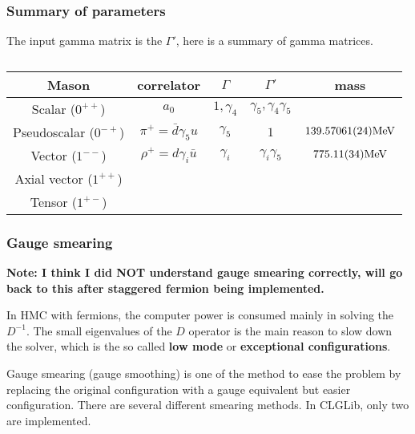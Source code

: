 \subsubsection{\label{SummaryOfparametersMesonCorrelator}Summary of parameters}

The input gamma matrix is the $\Gamma '$, here is a summary of gamma matrices.

\begin{table}
\begin{center}
\begin{tabular}{ccccc}
\hline
Mason & correlator & $\Gamma$ & $\Gamma '$ & mass \\
\hline
Scalar ($0^{++}$) & $a_0$ & $1,\gamma _4$ & $\gamma _5,\gamma _4\gamma _5$ & \\
Pseudoscalar ($0^{-+}$) & $\pi ^+=\bar{d}\gamma _5u$ & $\gamma _5$ & $1$ & $139.57061(24){\rm MeV}$ \\
Vector ($1^{--}$) & $\rho ^+ = d\gamma _i \bar{u}$ & $\gamma _i$ & $\gamma _i\gamma _5$ & $775.11(34){\rm MeV}$ \\
Axial vector ($1^{++}$)& & & & \\
Tensor ($1^{+-}$)& & & & \\
\hline
\end{tabular}
\end{center}
\caption{\label{tab2}}
\end{table}


\subsubsection{\label{Gauge_Smearing}Gauge smearing}

\textbf{\textcolor[rgb]{1,0,0}{Note: I think I did NOT understand gauge smearing correctly, will go back to this after staggered fermion being implemented.}}

In HMC with fermions, the computer power is consumed mainly in solving the $D^{-1}$. The small eigenvalues of the $D$ operator is the main reason to slow down the solver, which is the so called \textbf{low mode} or \textbf{exceptional configurations}.

Gauge smearing (gauge smoothing) is one of the method to ease the problem by replacing the original configuration with a gauge equivalent but easier configuration. There are several different smearing methods. In CLGLib, only two are implemented.

